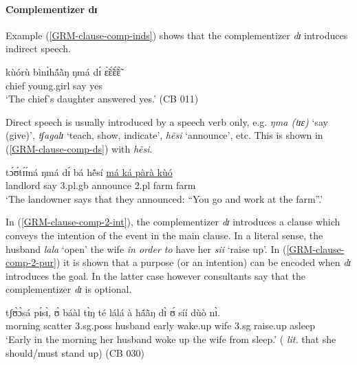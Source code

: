  \z 
 \z
 

\paragraph{Complementizer dɪ}
\label{GRM-clause-comp-di}


Example (\ref{GRM-clause-comp-inds}) shows that the complementizer {\it dɪ}
introduces indirect speech. 
\begin{exe}
 \ex\label{GRM-clause-comp-inds}
 \gll    kùórù   bìnɪ̀hã́ã̀ŋ          ŋmá   dɪ́     ɛ̃̀ɛ̃́ɛ̃́ɛ̃̀  \\
 chief   young.girl   say   {\comp}    yes\\
 \glt  `The chief's daughter answered yes.'  (CB 011) 
 \z


Direct speech is usually introduced by a speech
verb only, e.g. {\it ŋma (tɪɛ)} `say (give)',   {\it tʃagalɪ} `teach, show,
indicate', {\it hẽsi} `announce', etc.  This is shown in 
(\ref{GRM-clause-comp-ds}) with {\it hẽsi}.

\begin{exe}
 \ex\label{GRM-clause-comp-ds}
 \gll tɔ́ʊ́tɪ́ɪ́ná ŋmá dɪ́ bá hẽ́sí \underline{má ká pàrà kùó}\\
 landlord say  {\comp} {\sc 3.pl.g}b  announce {{\sc 2.pl} {\egr} farm farm}\\
 \glt  `The landowner says that they announced:  ``You go and work at the
farm''.' 
 \z

In (\ref{GRM-clause-comp-2-int}),  the complementizer {\it dɪ} introduces a
clause which conveys the intention of the event in the main clause. In a literal
sense, the husband {\it lala} `open'  the wife {\it in order to} have her {\it 
sii} `raise up'. In (\ref{GRM-clause-comp-2-pur}) it is shown that a purpose (or
an intention) can be encoded when {\it dɪ} introduces the goal. In the latter 
case however consultants say that the complementizer {\it dɪ} is optional.



\ea\label{GRM-clause-comp-2}

 \ea\label{GRM-clause-comp-2-int}
\gll  tʃʊ̀ɔ̀sá   pɪ́sɪ̀,    ʊ̀   báàl    tɪ̀ŋ té    lálá    à hã́ã̀ŋ   
 dɪ̀  ʊ́         síí        dùò    nɪ̀.\\
  morning scatter          {\sc 3.sg.poss}   husband  {\art} 
early  wake.up 
{\art}  wife         {\comp}      {\sc 3.sg}         raise.up    asleep  
{\postp} \\
 \glt  `Early in the morning her husband woke up the wife from sleep.' ({\it
lit.} that she should/must stand up)  (CB 030)


\end{exe}
\end{exe}

